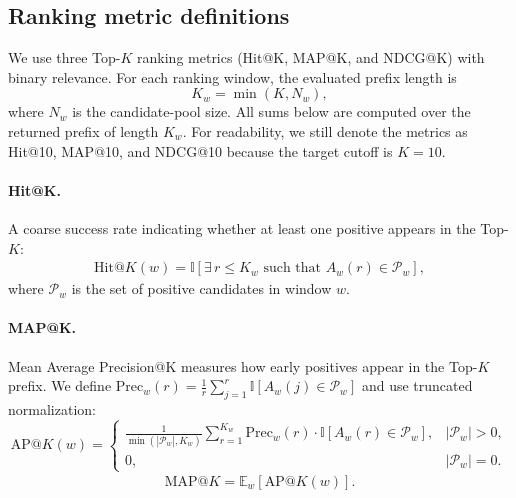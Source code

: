 \documentclass{article}
\begin{document}
\subsection{Ranking metric definitions}
\label{sec:app_metric_defs}

We use three Top-$K$ ranking metrics (Hit@K, MAP@K, and NDCG@K) with binary relevance.
For each ranking window, the evaluated prefix length is
\[
K_w=\min(K,N_w),
\]
where $N_w$ is the candidate-pool size.
All sums below are computed over the returned prefix of length $K_w$.
For readability, we still denote the metrics as Hit@10, MAP@10, and NDCG@10 because the target cutoff is $K=10$.

\paragraph{Hit@K.}
A coarse success rate indicating whether at least one positive appears in the Top-$K$:
\begin{equation}
\begin{aligned}
\mathrm{Hit}@K(w) =
\mathbb{I}\left[\exists\, r \le K_w \text{ such that } A_w(r)\in \mathcal{P}_w\right],
\end{aligned}
\end{equation}
where $\mathcal{P}_w$ is the set of positive candidates in window $w$.

\paragraph{MAP@K.}
Mean Average Precision@K measures how early positives appear in the Top-$K$ prefix.
We define $\mathrm{Prec}_w(r)=\frac{1}{r}\sum_{j=1}^{r}\mathbb{I}[A_w(j)\in \mathcal{P}_w]$ and use truncated normalization:
\begin{equation}
\mathrm{AP}@K(w)=
\begin{cases}
\frac{1}{\min(|\mathcal{P}_w|,K_w)}
\sum_{r=1}^{K_w}
\mathrm{Prec}_w(r)\cdot
\mathbb{I}[A_w(r)\in \mathcal{P}_w],
& |\mathcal{P}_w|>0,\\[6pt]
0, & |\mathcal{P}_w|=0.
\end{cases}
\end{equation}
\begin{equation}
\begin{aligned}
\mathrm{MAP}@K=\mathbb{E}_w[\mathrm{AP}@K(w)].
\end{aligned}
\end{equation}
\end{document}
